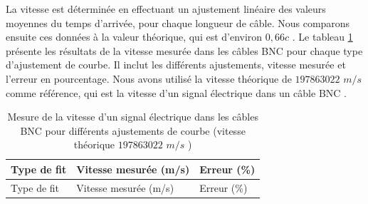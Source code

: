 \begin{onehalfspace}
    
    

    \noindent La vitesse est 
    déterminée en effectuant un ajustement linéaire des valeurs 
    moyennes du temps d'arrivée, pour chaque longueur de câble. Nous 
    comparons ensuite ces données à la valeur théorique, qui est 
    d’environ $0,66 c$ \cite{arrl2019}. Le tableau \ref{table:speed-BNC-table} présente les résultats
    de la vitesse mesurée dans les câbles BNC pour chaque type 
    d’ajustement de courbe. Il inclut les différents ajustements, vitesse mesurée
    et l'erreur en pourcentage.
    Nous avons utilisé la vitesse théorique de $197 863 022$ $m/s$
    comme référence, qui est la vitesse d'un signal électrique dans un câble BNC
    \cite{arrl2019,thorlabs2021}.
    

    \begin{longtable}{p{2.0cm} p{4.0cm} p{2.0cm} }
        \caption{Mesure de la vitesse d'un signal électrique dans les câbles BNC 
        pour différents ajustements de courbe (vitesse théorique $197863022$ $m/s$ \cite{arrl2019})} \\
        \toprule
        \label{table:speed-BNC-table}
        Type de fit & Vitesse mesurée (m/s) & Erreur (\%) \\
        \midrule
        \endfirsthead
        
        \toprule
        Type de fit & Vitesse mesurée (m/s) & Erreur (\%) \\
        \midrule
        \endhead
        

\end{longtable}
\end{onehalfspace}

